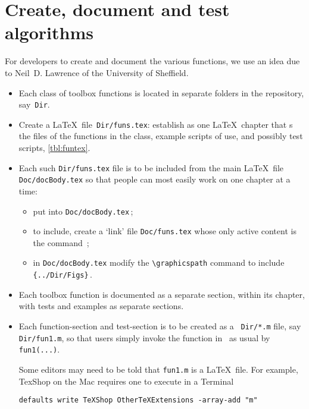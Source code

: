 \chapter{Create, document and test algorithms}
\label{sec:contribute}
\secttoc
\def\LaTeX{LaTeX}%

For developers to create and document the various functions, we use an idea due to Neil~D. Lawrence of the University of Sheffield.

\begin{itemize}
\item Each class of toolbox functions is located in separate folders in the repository, say~\verb|Dir|.

\item Create a \LaTeX\ file~\verb|Dir/funs.tex|: establish as one \LaTeX\ chapter that \verb||s the  files of the functions in the class, example scripts of use, and possibly test scripts, \autoref{tbl:funtex}.

\item Each such \verb|Dir/funs.tex| file is to be included from the main \LaTeX\ file \verb|Doc/docBody.tex| so that people can most easily work on one chapter at a time: 
\begin{itemize}
\item put \verb|| into \verb|Doc/docBody.tex|\,;
\item to include, create a `link' file \verb|Doc/funs.tex| whose only active content is the command \verb||\,;
\item in \verb|Doc/docBody.tex| modify the \verb|\graphicspath| command to include \verb|{../Dir/Figs}|\,.
\end{itemize}

\item Each toolbox function is documented as a separate section, within its chapter, with tests and examples as separate sections.

\item Each function-section and test-section is to be created as a \script\ \verb|Dir/*.m| file, say \verb|Dir/fun1.m|, so that users simply invoke the function in \script\ as usual by \verb|fun1(...)|.

Some editors may need to be told that \verb|fun1.m| is a \LaTeX\ file.  For example, TexShop on the Mac requires one to execute in a Terminal
\begin{verbatim}
defaults write TeXShop OtherTeXExtensions -array-add "m"
\end{verbatim}


\end{itemize}
